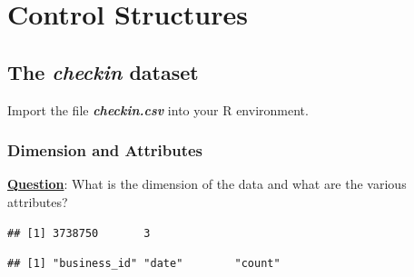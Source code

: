 \documentclass[12pt]{book}\usepackage{knitr}
\begin{document}



\newpage
\section{Control Structures}

\subsection{The \textbf{\emph{checkin}} dataset}
\noindent Import the file \emph{\textbf{checkin.csv}} into your R environment. 


\subsubsection{Dimension and Attributes}
\noindent \textbf{\underline{Question}}: What is the dimension of the data and what are the various attributes?
\begin{knitrout}
\color{fgcolor}\begin{kframe}
\begin{alltt}
\end{alltt}
\begin{verbatim}
## [1] 3738750       3
\end{verbatim}
\begin{alltt}
\end{alltt}
\begin{verbatim}
## [1] "business_id" "date"        "count"
\end{verbatim}
\begin{alltt}
\end{alltt}
\end{kframe}
\end{knitrout}
\end{document}
